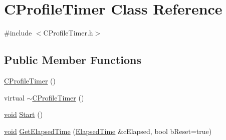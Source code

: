\hypertarget{class_c_profile_timer}{\section{\-C\-Profile\-Timer \-Class \-Reference}
\label{class_c_profile_timer}
}


{\ttfamily \#include $<$\-C\-Profile\-Timer.\-h$>$}

\subsection*{\-Public \-Member \-Functions}
\begin{DoxyCompactItemize}
\item 
\hyperlink{class_c_profile_timer_a92dc183d7ad6024bbef9ddf7c11575e3}{\-C\-Profile\-Timer} ()
\item 
virtual \hyperlink{class_c_profile_timer_a509d0492413e3f19975744b9146cbf4f}{$\sim$\-C\-Profile\-Timer} ()
\item 
\hyperlink{_cpclient_8h_a6464f7480a0fd0ee170cba12b2c0497f}{void} \hyperlink{class_c_profile_timer_a8ca922af73784e9a805b3fc91d99328e}{\-Start} ()
\item 
\hyperlink{_cpclient_8h_a6464f7480a0fd0ee170cba12b2c0497f}{void} \hyperlink{class_c_profile_timer_ab2e930ba032083e6276940236bc78551}{\-Get\-Elapsed\-Time} (\hyperlink{class_elapsed_time}{\-Elapsed\-Time} \&c\-Elapsed, bool b\-Reset=true)
\end{DoxyCompactItemize}
